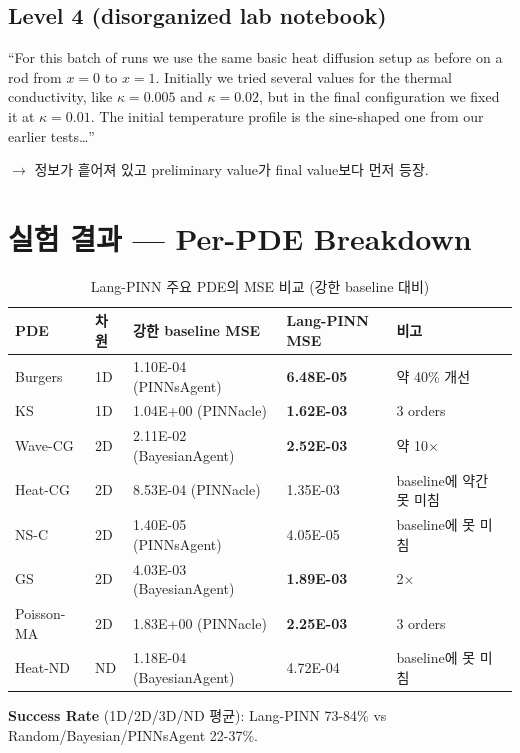 \documentclass[11pt,a4paper,oneside]{report}
\begin{document}
\subsection{Level 4 (disorganized lab notebook)}
\begin{quotebox}
``For this batch of runs we use the same basic heat diffusion setup as before on a rod from $x=0$ to $x=1$. Initially we tried several values for the thermal conductivity, like $\kappa=0.005$ and $\kappa=0.02$, but in the final configuration we fixed it at $\kappa=0.01$. The initial temperature profile is the sine-shaped one from our earlier tests\ldots''
\end{quotebox}
$\rightarrow$ 정보가 흩어져 있고 preliminary value가 final value보다 먼저 등장.

\section{실험 결과 --- Per-PDE Breakdown}

\begin{table}[h]
\centering
\small
\begin{tabular}{lllll}
\toprule
\textbf{PDE} & \textbf{차원} & \textbf{강한 baseline MSE} & \textbf{Lang-PINN MSE} & \textbf{비고} \\
\midrule
Burgers     & 1D & 1.10E-04 (PINNsAgent)   & \textbf{6.48E-05} & 약 40\% 개선 \\
KS          & 1D & 1.04E+00 (PINNacle)      & \textbf{1.62E-03} & 3 orders \\
Wave-CG     & 2D & 2.11E-02 (BayesianAgent) & \textbf{2.52E-03} & 약 10$\times$ \\
Heat-CG     & 2D & 8.53E-04 (PINNacle)      & 1.35E-03           & baseline에 약간 못 미침 \\
NS-C        & 2D & 1.40E-05 (PINNsAgent)   & 4.05E-05           & baseline에 못 미침 \\
GS          & 2D & 4.03E-03 (BayesianAgent) & \textbf{1.89E-03} & 2$\times$ \\
Poisson-MA  & 2D & 1.83E+00 (PINNacle)      & \textbf{2.25E-03} & 3 orders \\
Heat-ND     & ND & 1.18E-04 (BayesianAgent) & 4.72E-04           & baseline에 못 미침 \\
\bottomrule
\end{tabular}
\caption{Lang-PINN 주요 PDE의 MSE 비교 (강한 baseline 대비)}
\end{table}

\textbf{Success Rate} (1D/2D/3D/ND 평균): Lang-PINN 73-84\% vs Random/Bayesian/PINNsAgent 22-37\%.
\end{document}
